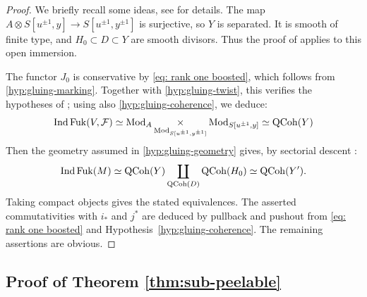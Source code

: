 \documentclass[12pt, letter]{amsart}
\theoremstyle{definition}
\DeclareMathOperator{\Ind}{Ind}
\numberwithin{equation}{section}
\begin{document}
\begin{proof}
We briefly recall some ideas, see \cite[Sec. 5]{HS} for details. 
The map $A\otimes S[u^{\pm1},y]\to S[u^{\pm1},y^{\pm1}]$
is surjective, so $Y$ is separated. It is smooth of finite type,
and $H_0\subset D\subset Y$ are smooth divisors.
Thus the proof of \cite[Proposition~5.3]{HS} applies to this
open immersion.

The functor $J_0$ is conservative by \eqref{eq: rank one boosted}, which follows from \ref{hyp:gluing-marking}.
Together with 
\ref{hyp:gluing-twist}, this verifies the hypotheses of \cite[Theorem~2.1]{HS}; using also \ref{hyp:gluing-coherence}, we deduce: 
\begin{equation}
    \label{eq:B-pull}
    \Ind\Fuk(V,\mathcal F)\simeq
 \Mod_A\mathop{\times}_{\Mod_{S[u^{\pm1},y^{\pm1}]}}
                    \Mod_{S[u^{\pm1},y]}
 \simeq\QCoh(Y)
\end{equation}
Then the geometry assumed in \ref{hyp:gluing-geometry} gives, by sectorial descent \cite{GPS}: 
\begin{equation}\label{eq:B-push}
 \Ind\Fuk(M)\simeq
 \QCoh(Y)\mathop{\coprod}_{\QCoh(D)}\QCoh(H_0)
 \simeq\QCoh(Y').
\end{equation}
Taking compact objects gives the stated equivalences.
The asserted commutativities with $i_*$ and $j^*$ are deduced by pullback and pushout from \eqref{eq: rank one boosted} and 
Hypothesis~\ref{hyp:gluing-coherence}.  The remaining assertions are obvious.
\end{proof}



\subsection{Proof of Theorem \ref{thm:sub-peelable}}
\end{document}
